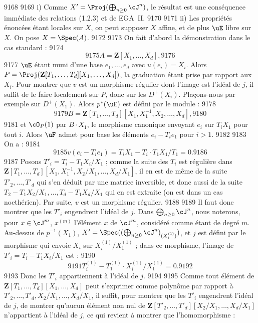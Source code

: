   9168	
  9169	i) Comme $X' = \Proj(\bigoplus_{n \geq 0} \cJ^n)$, le r\'esultat est une cons\'equence imm\'ediate des relations (1.2.3) et de EGA~II.
  9170	
  9171	ii) Les propri\'et\'es \'enonc\'ees \'etant locales sur $X$, on peut supposer $X$ affine, et de plus $\uE$ libre sur $X$. On pose $X = \Spec(A)$.
  9172	
  9173	On fait d'abord la d\'emonstration dans le cas standard :
  9174	\[
  9175	A = \mathbf{Z}[X_1,\dots,X_d],
  9176	\]
  9177	$\uE$ \'etant muni d'une base $e_1,\dots,e_d$ avec $u(e_i) = X_i$. Alors $P = \Proj(\mathbf{Z}[T_1,\dots,T_d][X_1,\dots,X_d])$, la graduation \'etant prise par rapport aux $X_i$. Pour montrer que $v$ est un morphisme r\'egulier dont l'image est l'id\'eal de $j$, il suffit de le faire localement sur $P$, donc sur les $D^+(X_i)$. Pla\c{c}ons-nous par exemple sur $D^+(X_1)$. Alors $p^{*}(\uE)$ est d\'efini par le module :
  9178	\[
  9179	B = \mathbf{Z}[T_1,\dots,T_d][X_1,X_1^{-1},X_2,\dots,X_d],
  9180	\]
  9181	et $\cO_P(1)$ par $B \cdot X_1$, le morphisme canonique envoyant $e_i$ sur $T_i X_1$ pour tout $i$. Alors $\uF$ admet pour base les \'el\'ements $e_i - T_i e_1$ pour $i > 1$.
  9182	
  9183	On a :
  9184	\[
  9185	v(e_i - T_i e_1) = T_i X_1 - T_i \cdot T_1 X_1 / T_1 = 0.
  9186	\]
  9187	Posons $T'_i = T_i - T_1 X_i/X_1$ ; comme la suite des $T_i$ est r\'eguli\`ere dans $\mathbf{Z}[T_1,\dots,T_d][X_1,X_1^{-1},X_2/X_1,\dots,X_d/X_1]$, il en est de m\^eme de la suite $T'_2,\dots,T'_d$ qui s'en d\'eduit par une matrice inversible, et donc aussi de la suite $T_2 - T_1 X_2/X_1, \dots, T_d - T_1 X_d/X_1$ qui en est extraite (on est dans un cas noeth\'erien). Par suite, $v$ est un morphisme r\'egulier.
  9188	
  9189	Il faut donc montrer que les $T'_i$ engendrent l'id\'eal de $j$. Dans $\bigoplus_{n \geq 0} \cJ^n$, nous noterons, pour $x \in \cJ^m$, $x^{(m)}$ l'\'el\'ement $x$ de $\cJ^m$, consid\'er\'e comme \'etant de degr\'e $m$. Au-dessus de $p^{-1}(X_1)$, $X' = \Spec((\bigoplus_{n \geq 0} \cJ^n)_{(X_1^{(1)})})$, et $j$ est d\'efini par le morphisme qui envoie $X_i$ sur $X_i^{(1)}/X_1^{(1)}$ ; dans ce morphisme, l'image de $T'_i = T_i - T_1 X_i/X_1$ est :
  9190	\[
  9191	T_i^{(1)} - T_1^{(1)} \cdot X_i^{(1)}/X_1^{(1)} = 0.
  9192	\]
  9193	Donc les $T'_i$ appartiennent \`a l'id\'eal de $j$.
  9194	
  9195	Comme tout \'el\'ement de $\mathbf{Z}[T_1,\dots,T_d][X_1,\dots,X_d]$ peut s'exprimer comme polyn\^ome par rapport \`a $T'_2,\dots,T'_d, X_2/X_1,\dots,X_d/X_1$, il suffit, pour montrer que les $T'_i$ engendrent l'id\'eal de $j$, de montrer qu'aucun \'el\'ement non nul de $\mathbf{Z}[T'_2,\dots,T'_d][X_2/X_1,\dots,X_d/X_1]$ n'appartient \`a l'id\'eal de $j$, ce qui revient \`a montrer que l'homomorphisme :
